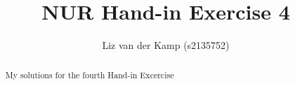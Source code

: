 \documentclass[a4paper,10pt]{article}
\title{NUR Hand-in Exercise 4}
\author{Liz van der Kamp (s2135752)}
\begin{document}
\maketitle

\begin{abstract}
 My solutions for the fourth Hand-in Excercise
\end{abstract}






\end{document}
